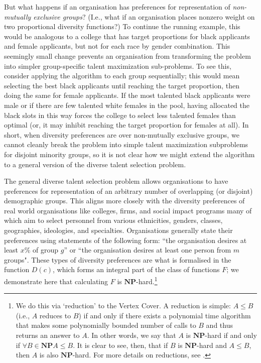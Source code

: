 But what happens if an organisation has preferences for representation of \emph{non-mutually exclusive groups}? (I.e., what if an organisation places nonzero weight on two proportional diversity functions?) To continue the running example, this would be analogous to a college that has target proportions for black applicants and female applicants, but not for each race by gender combination. This seemingly small change prevents an organisation from transforming the problem into simpler group-specific talent maximization sub-problems. To see this, consider applying the \textcite{kleinberg2018algorithmic} algorithm to each group sequentially; this would mean selecting the best black applicants until reaching the target proportion, then doing the same for female applicants. If the most talented black applicants were male or if there are few talented white females in the pool, having allocated the black slots in this way forces the college to select less talented females than optimal (or, it may inhibit reaching the target proportion for females at all). In short, when diversity preferences are over non-mutually exclusive groups, we cannot cleanly break the problem into simple talent maximization subproblems for disjoint minority groups, so it is not clear how we might extend the \textcite{kleinberg2018algorithmic} algorithm to a general version of the diverse talent selection problem. 

The general diverse talent selection problem allows organisations to have preferences for representation of an arbitrary number of overlapping (or disjoint) demographic groups. This aligns more closely with the diversity preferences of real world organisations like colleges, firms, and social impact programs many of which aim to select personnel from various ethnicities, genders, classes, geographies, ideologies, and specialties. Organisations generally state their preferences using statements of the following form: ``the organisation desires at least $x\%$ of group $g$'' or ``the organisation desires at least one person from $m$ groups". These types of diversity preferences are what is formalised in the function $D(c)$, which forms an integral part of the class of functions $F$; we demonstrate here that calculating $F$ is $\mathbf{NP}$-hard.\footnote{We do this via `reduction' to the Vertex Cover. A reduction is simple: $A \leq B$ (i.e., $A$ reduces to $B$) if and only if there exists a polynomial time algorithm that makes some polynomially bounded number of calls to $B$ and thus returns an answer to $A$. In other words, we say that $A$ is $\mathbf{NP}$-hard if and only if $\forall B \in \mathbf{NP} A \leq B$. It is clear to see, then, that if $B$ is $\mathbf{NP}$-hard and $A \leq B$, then $A$ is also $\mathbf{NP}$-hard. For more details on reductions, see \textcite{10.5555/1074100.1074233}.}

